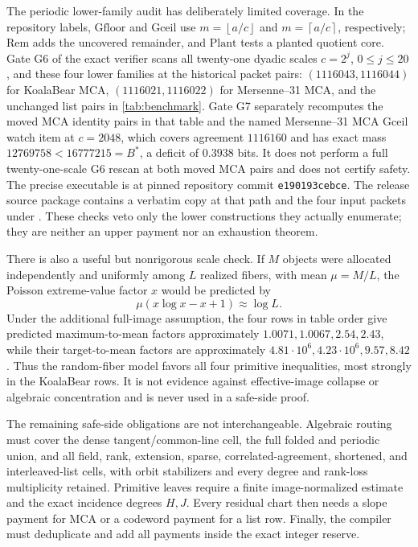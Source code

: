 \documentclass[a4paper,11pt]{amsart}
\theoremstyle{remark}
\newcommand{\floor}[1]{\left\lfloor#1\right\rfloor}
\newcommand{\ceil}[1]{\left\lceil#1\right\rceil}
\begin{document}
The periodic lower-family audit has deliberately limited coverage.  In the
repository labels, \(\mathrm{Gfloor}\) and \(\mathrm{Gceil}\) use
\(m=\floor{a/c}\) and \(m=\ceil{a/c}\), respectively; \(\mathrm{Rem}\)
adds the uncovered remainder, and \(\mathrm{Plant}\) tests a planted quotient
core.  Gate G6 of the exact verifier scans all twenty-one dyadic scales
\(c=2^j\), \(0\le j\le20\), and these four lower families at the historical
packet pairs: \((1116043,1116044)\) for KoalaBear MCA,
\((1116021,1116022)\) for Mersenne--31 MCA, and the unchanged list pairs in
\cref{tab:benchmark}.  Gate G7 separately recomputes the moved MCA identity
pairs in that table and the named Mersenne--31 MCA
\(\mathrm{Gceil}\) watch item at \(c=2048\), which covers agreement
\(1116160\) and has exact mass \(12769758<16777215=B^*\), a deficit of
\(0.3938\) bits.  It does not perform a full twenty-one-scale G6 rescan at
both moved MCA pairs and does not certify safety.  The precise executable is
 at pinned
repository commit \texttt{e190193cebce}.  The release source package contains
a verbatim copy at that path and the four input packets under
 \cite{RSMCARepo}.
These checks veto only the lower
constructions they actually enumerate; they are neither an upper payment nor
an exhaustion theorem.

There is also a useful but nonrigorous scale check.  If \(M\) objects were
allocated independently and uniformly among \(L\) realized fibers, with
mean \(\mu=M/L\), the Poisson extreme-value factor \(x\) would be predicted
by
\[
 \mu(x\log x-x+1)\approx\log L.
\]
Under the additional full-image assumption, the four rows in table order
give predicted maximum-to-mean factors approximately
\(1.0071,1.0067,2.54,2.43\), while their target-to-mean factors are
approximately
\(4.81\cdot10^6,4.23\cdot10^6,9.57,8.42\).
Thus the random-fiber model favors all four primitive inequalities, most
strongly in the KoalaBear rows.  It is not evidence against effective-image
collapse or algebraic concentration and is never used in a safe-side proof.

The remaining safe-side obligations are not interchangeable.  Algebraic
routing must cover the dense tangent/common-line cell, the full folded and
periodic union, and all field, rank, extension, sparse, correlated-agreement,
shortened, and interleaved-list cells, with orbit stabilizers and every
degree and rank-loss multiplicity retained.
Primitive leaves require a finite image-normalized estimate and the exact
incidence degrees \(H,J\).  Every residual chart then needs a slope payment
for MCA or a codeword payment for a list row.  Finally, the compiler must
deduplicate and add all payments inside the exact integer reserve.
\end{document}
